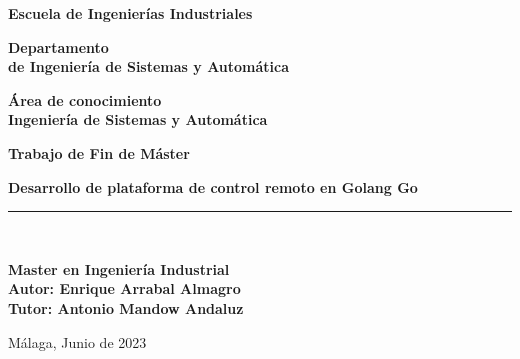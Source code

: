 \begin{center}
	\begin{large}
		\textbf {Escuela de Ingenierías Industriales\\}
	\end{large}	
	\vspace*{0.5cm}
	\begin{large}
		\textbf {Departamento\\ de Ingeniería de Sistemas y Automática\\}
	\end{large}	
	\vspace*{1cm}
	\begin{large}
		\textbf {Área de conocimiento\\Ingeniería de Sistemas y Automática\\}
	\end{large}	
	\vspace*{1cm}	
	\begin{Huge}
		\textbf {Trabajo de Fin de Máster\\}
	\end{Huge}
	\vspace*{0.3cm}
	\begin{LARGE}
		\textbf {Desarrollo de plataforma de control remoto en Golang Go\\}
	\end{LARGE}
	\vspace*{0.3cm}
	\rule{5cm}{0.01cm}\\
	\vspace*{1cm}
	\begin{large}
		\textbf{Master en Ingeniería Industrial\\}
		\vspace*{0.5cm}
		\textbf {Autor: Enrique Arrabal Almagro\\}
		\vspace*{1cm}
		\textbf {Tutor: Antonio Mandow Andaluz\\}
	\end{large}
	\vspace*{3cm}
\begin{center}
\textbf{}{Málaga, Junio de 2023}
\end{center}					
\end{center}
\thispagestyle{empty}

